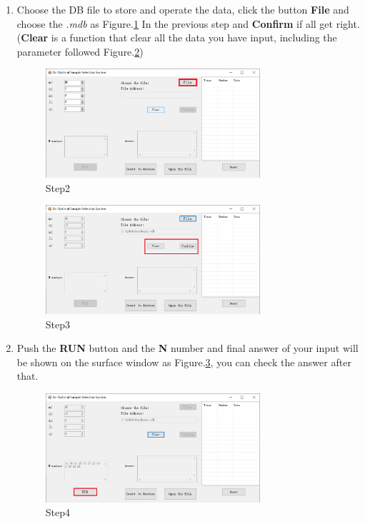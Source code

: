 \begin{enumerate}
\item Choose the DB file to store and operate the data, click the button \textbf{File} and choose the \emph{.mdb} as Figure.\ref{fig:st2}
In the previous step and \textbf{Confirm} if all get right.(\textbf{Clear} is a function that clear all the data you have input, 
including the parameter followed \textup{Figure.\ref{fig:st3}})
\begin{figure}[!htbp]
	\centering
	\includegraphics[width=0.75\textwidth]{images/step2.png}
	\caption{Step2}
	\label{fig:st2}
\end{figure}
\begin{figure}[!htbp]
	\centering
	\includegraphics[width=0.75\textwidth]{images/step3.png}
	\caption{Step3}
	\label{fig:st3}
\end{figure}

\item Push the \textbf{RUN} button and the \textbf{N} number and final answer of your input will be shown 
on the surface window as Figure.\ref{fig:st4}, you can check the answer after that.
\begin{figure}[!htbp]
	\centering
	\includegraphics[width=0.75\textwidth]{images/step4.png}
	\caption{Step4}
	\label{fig:st4}
\end{figure}


\end{enumerate}

